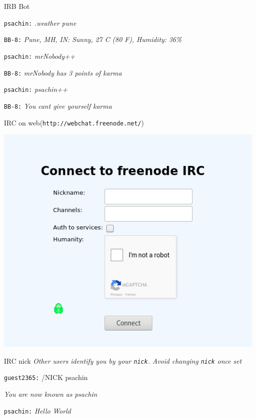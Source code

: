 \documentclass[10pt]{beamer}
\begin{document}
\begin{frame}[fragile,label={sec:org7e92b5f}]{IRB Bot}
 \begin{block}{}
\texttt{psachin:} \emph{.weather pune}

\texttt{BB-8:} \emph{Pune, MH, IN: Sunny, 27 C (80 F), Humidity: 36\%}
\end{block}


\begin{block}{}
\texttt{psachin:} \emph{mrNobody++}

\texttt{BB-8:} \emph{mrNobody has 3 points of karma}
\end{block}


\begin{block}{}
\texttt{psachin:} \emph{psachin++}

\texttt{BB-8:} \emph{You cant give yourself karma}
\end{block}
\end{frame}


\begin{frame}[fragile,label={sec:org2b2336d}]{IRC on web(\texttt{http://webchat.freenode.net/})}
 \begin{center}
\includegraphics[width=.9\linewidth]{./webchat.freenode.png}
\end{center}
\end{frame}

\begin{frame}[fragile,label={sec:org55a1fef}]{IRC nick}
 \emph{Other users identify you by your \texttt{nick}. Avoid changing \texttt{nick}
once set}

\begin{block}{}
\texttt{guest2365:} /NICK psachin

\emph{You are now known as psachin}

\texttt{psachin:} \emph{Hello World}
\end{block}
\end{frame}
\end{document}

